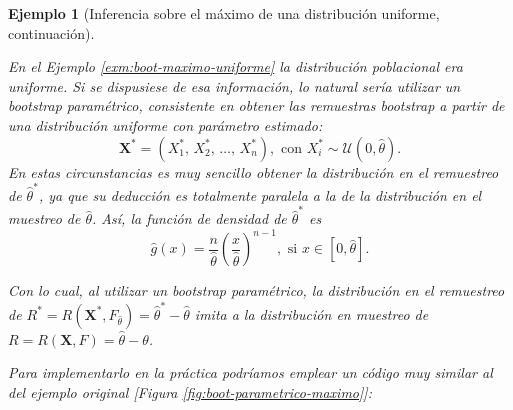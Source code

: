 \documentclass[
]{book}
\theoremstyle{break}
\newtheorem{example}{Ejemplo}[chapter]
\theoremstyle{nonumberplain}
\begin{document}
\begin{example}[Inferencia sobre el máximo de una distribución uniforme, continuación]
\protect\hypertarget{exm:boot-maximo-parametrico}{}\label{exm:boot-maximo-parametrico}

En el Ejemplo \ref{exm:boot-maximo-uniforme} la distribución poblacional era uniforme.
Si se dispusiese de esa información, lo natural sería utilizar un bootstrap paramétrico,
consistente en obtener las remuestras bootstrap a partir de una distribución uniforme con parámetro estimado:
\[\mathbf{X}^{\ast}=\left( X_1^{\ast}\text{, }X_2^{\ast}\text{, 
}\ldots \text{, }X_n^{\ast} \right), \text{ con } X_i^{\ast} \sim \mathcal{U}\left( 0,\hat{\theta}\right).\]
En estas circunstancias es muy sencillo obtener la distribución en el
remuestreo de \(\hat{\theta}^{\ast}\), ya que su deducción es totalmente
paralela a la de la distribución en el muestreo de \(\hat{\theta}\). Así,
la función de densidad de \(\hat{\theta}^{\ast}\) es
\[\hat{g}\left( x \right) =\frac{n}{\hat{\theta}}\left( \frac{x}{\hat{\theta}}
 \right)^{n-1},\text{ si }x\in \left[ 0,\hat{\theta}\right] .\]

Con lo cual, al utilizar un bootstrap paramétrico, la distribución en el
remuestreo de \(R^{\ast}=R\left( \mathbf{X}^{\ast},F_{\hat{ \theta}} \right) =\hat{\theta}^{\ast}-\hat{\theta}\) imita a la
distribución en muestreo de
\(R=R\left( \mathbf{X},F \right) =\hat{\theta}-\theta\).

Para implementarlo en la práctica podríamos emplear un código muy similar al
del ejemplo original {[}Figura \ref{fig:boot-parametrico-maximo}{]}:


\end{example}
\end{document}
